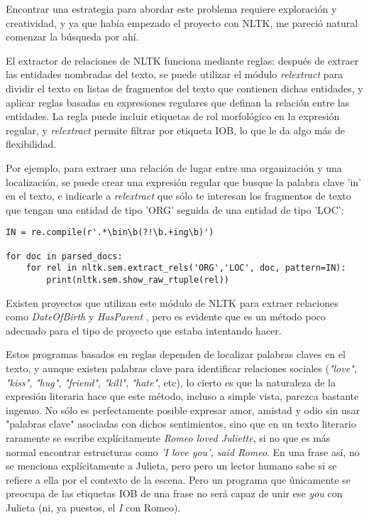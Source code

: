 \documentclass{pre-tfg}
\begin{document}
Encontrar una estrategia para abordar este problema requiere exploración y creatividad, y ya que había empezado el proyecto con NLTK, me pareció natural comenzar la búsqueda por ahí.

El extractor de relaciones de NLTK funciona mediante reglas: después de extraer las entidades nombradas del texto, se puede utilizar el módulo \textit{relextract} para dividir el texto en listas de fragmentos del texto que contienen dichas entidades, y aplicar reglas basadas en expresiones regulares que definan la relación entre las entidades. La regla puede incluir etiquetas de rol morfológico en la expresión regular, y \textit{relextract} permite filtrar por etiqueta IOB, lo que le da algo más de flexibilidad.

Por ejemplo, para extraer una relación de lugar entre una organización y una localización, se puede crear una expresión regular que busque la palabra clave 'in' en el texto, e indicarle a \textit{relextract} que sólo te interesan los fragmentos de texto que tengan una entidad de tipo 'ORG' seguida de una entidad de tipo 'LOC':
\begin{lstlisting}[style=consola, caption=Ejemplo de código que utiliza el módulo \textit{regexp} de NLTK para extraer relaciones de lugar y mostrarlas por pantalla. Adaptado del capítulo 7 de Natural Language Processing with Python\cite{bird_2012}]
IN = re.compile(r'.*\bin\b(?!\b.+ing\b)')

for doc in parsed_docs:
	for rel in nltk.sem.extract_rels('ORG','LOC', doc, pattern=IN):
		print(nltk.sem.show_raw_rtuple(rel))

\end{lstlisting}

Existen proyectos que utilizan este módulo de NLTK para extraer relaciones como \textit{DateOfBirth} y \textit{HasParent} \cite{jose_2017}, pero es evidente que es un método poco adecuado para el tipo de proyecto que estaba intentando hacer.

Estos programas basados en reglas dependen de localizar palabras claves en el texto, y aunque existen palabras clave para identificar relaciones sociales (\textit{"love"}, \textit{"kiss"}, \textit{"hug"}, \textit{"friend"}, \textit{"kill"}, \textit{"hate"}, etc), lo cierto es que la naturaleza de la expresión literaria hace que este método, incluso a simple vista, parezca bastante ingenuo. No sólo es perfectamente posible expresar amor, amistad y odio sin usar "palabras clave" asociadas con dichos sentimientos, sino que en un texto literario raramente se escribe explícitamente \textit{Romeo loved Juliette}, si no que es más normal encontrar estructuras como \textit{'I love you', said Romeo}. En una frase así, no se menciona explícitamente a Julieta, pero pero un lector humano sabe si se refiere a ella por el contexto de la escena. Pero un programa que únicamente se preocupa de las etiquetas IOB de una frase no será capaz de unir ese \textit{you} con Julieta (ni, ya puestos, el \textit{I} con Romeo).
\end{document}
